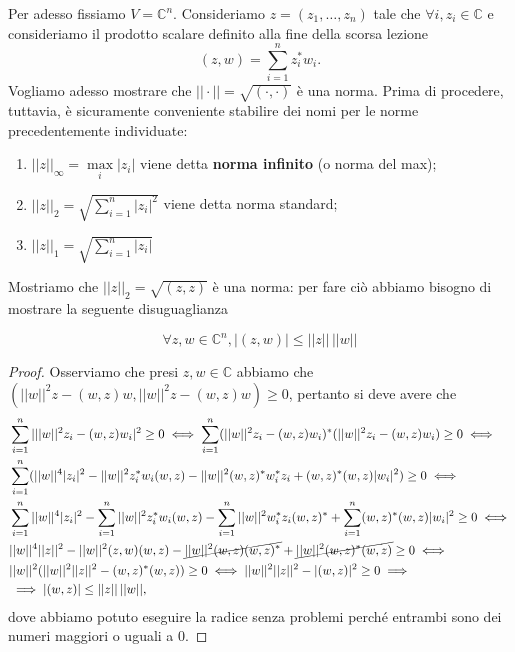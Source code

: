 \documentclass[12pt, twoside, italian, openany]{book}
\begin{document}
	Per adesso fissiamo $V = \mathbb{C}^n$. Consideriamo $z = (z_1, \ldots, z_n)$ tale che $\forall i, z_i \in \mathbb{C}$ e consideriamo il prodotto scalare definito alla fine della scorsa lezione
	$$
	(z, w) = \sum_{i=1}^n z_i^* w_i.
	$$
	Vogliamo adesso mostrare che $||\cdot|| = \sqrt{(\cdot, \cdot)}$ è una norma. Prima di procedere, tuttavia, è sicuramente conveniente stabilire dei nomi per le norme precedentemente individuate:
	\begin{enumerate}[label=\protect\circled{\arabic*}]
		\item $||z||_{\infty} = \max\limits_{i} |z_i|$ viene detta \textbf{norma infinito} (o norma del max);
		\item $||z||_{2} = \sqrt{\sum\limits_{i=1}^n |z_i|^2}$ viene detta norma standard;
		\item $||z||_{1} = \sqrt{\sum\limits_{i=1}^n |z_i|}$
	\end{enumerate}
	Mostriamo che $||z||_2 = \sqrt{(z, z)}$ è una norma: per fare ciò abbiamo bisogno di mostrare la seguente disuguaglianza
	\begin{prop}
		$$
		\forall z, w \in \mathbb{C}^n, |(z, w)| \leq || z || \, || w ||
		$$
	\end{prop}
	\begin{proof}
		Osserviamo che presi $z, w \in \mathbb{C}$ abbiamo che $(||w||^2 z - (w, z) w, ||w||^2 z - (w, z) w) \geq 0$, pertanto si deve avere che
		\begin{align*}
		&\sum_{i=1}^n |||w||^2 z_i - (w, z)w_i|^2 \geq 0 \iff \sum_{i=1}^n (||w||^2 z_i - (w, z)w_i)^* (||w||^2z_i - (w, z)w_i) \geq 0 \iff \\
		&\sum_{i=1}^n (||w||^4 |z_i|^2 - ||w||^2 z_i^* w_i (w, z) - ||w||^2 (w, z)^* w_i^* z_i + (w, z)^* (w, z) |w_i|^2) \geq 0 \iff \\
		&\sum_{i=1}^n ||w||^4 |z_i|^2 - \sum_{i=1}^n ||w||^2 z_i^* w_i (w, z) - \sum_{i=1}^n ||w||^2 w_i^* z_i (w, z)^* + \sum_{i=1}^n (w,z)^* (w, z) |w_i|^2 \geq 0 \iff \\
		&||w||^4 ||z||^2 - ||w||^2 (z, w) (w, z) - \cancel{||w||^2 (w, z) (w, z)^*} + \cancel{||w||^2 (w, z)^* (w, z)} \geq 0 \iff \\
		&||w||^2 ( || w ||^2 || z ||^2 - (w, z)^* (w, z)) \geq 0 \iff ||w||^2 ||z||^2 - |(w, z)|^2 \geq 0 \implies \\
		&\implies |(w, z)| \leq ||z|| \, ||w||,
		\end{align*}
		dove abbiamo potuto eseguire la radice senza problemi perché entrambi sono dei numeri maggiori o uguali a $0$.
	\end{proof}
\end{document}
